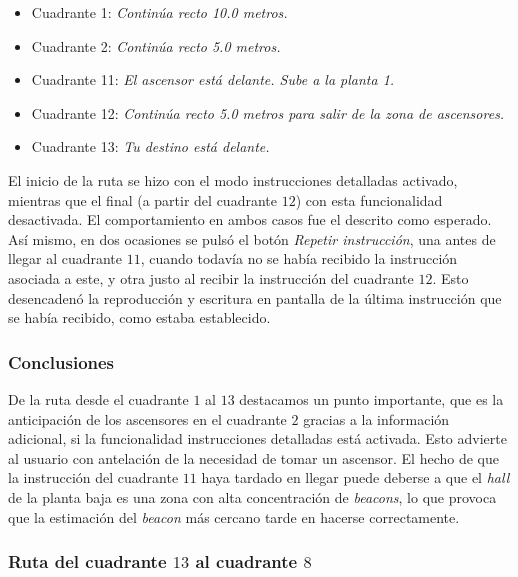 \begin{itemize}
	\item Cuadrante 1: \textit{Continúa recto 10.0 metros.}
	
	\item Cuadrante 2: \textit{Continúa recto 5.0 metros.} 
	
	\item Cuadrante 11: \textit{El ascensor está delante. Sube a la planta 1.}
	
	\item Cuadrante 12: \textit{Continúa recto 5.0 metros para salir de la zona de ascensores.}
	
	\item Cuadrante 13: \textit{Tu destino está delante.}
	
\end{itemize}

El inicio de la ruta se hizo con el modo instrucciones detalladas activado, mientras que el final (a partir del cuadrante $12$) con esta funcionalidad desactivada. El comportamiento en ambos casos fue el descrito como esperado. Así mismo, en dos ocasiones se pulsó el botón \textit{Repetir instrucción}, una antes de llegar al cuadrante $11$, cuando todavía no se había recibido la instrucción asociada a este, y otra justo al recibir la instrucción del cuadrante $12$. Esto desencadenó la reproducción y escritura en pantalla de la última instrucción que se había recibido, como estaba establecido. 

\subsubsection*{Conclusiones}


De la ruta desde el cuadrante $1$ al $13$ destacamos un punto importante, que es la anticipación de los ascensores en el cuadrante $2$ gracias a la información adicional, si la funcionalidad instrucciones detalladas está activada. Esto advierte al usuario con antelación de la necesidad de tomar un ascensor. El hecho de que la instrucción del cuadrante $11$ haya tardado en llegar puede deberse a que el \textit{hall} de la planta baja es una zona con alta concentración de \textit{beacons}, lo que provoca que la estimación del \textit{beacon} más cercano tarde en hacerse correctamente. 

\subsubsection{Ruta del cuadrante $13$ al cuadrante $8$}
\label{subsub:13al8}

